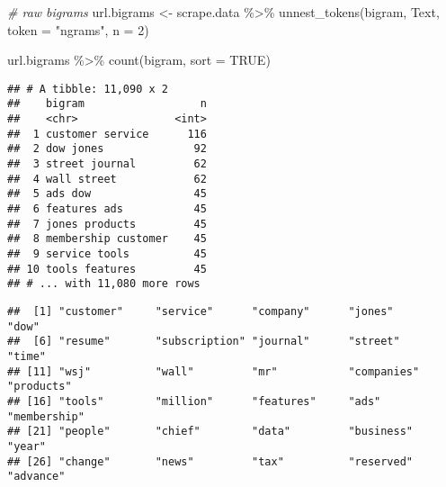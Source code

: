 \documentclass[
]{article}
\newenvironment{Shaded}{\begin{snugshade}}{\end{snugshade}}
\newcommand{\AttributeTok}[1]{\textcolor[rgb]{0.77,0.63,0.00}{#1}}
\newcommand{\CommentTok}[1]{\textcolor[rgb]{0.56,0.35,0.01}{\textit{#1}}}
\newcommand{\ConstantTok}[1]{\textcolor[rgb]{0.00,0.00,0.00}{#1}}
\newcommand{\DecValTok}[1]{\textcolor[rgb]{0.00,0.00,0.81}{#1}}
\newcommand{\FunctionTok}[1]{\textcolor[rgb]{0.00,0.00,0.00}{#1}}
\newcommand{\NormalTok}[1]{#1}
\newcommand{\OtherTok}[1]{\textcolor[rgb]{0.56,0.35,0.01}{#1}}
\newcommand{\SpecialCharTok}[1]{\textcolor[rgb]{0.00,0.00,0.00}{#1}}
\newcommand{\StringTok}[1]{\textcolor[rgb]{0.31,0.60,0.02}{#1}}
\begin{document}
\begin{Shaded}
\begin{Highlighting}[]
\CommentTok{\# raw bigrams}
\NormalTok{url.bigrams }\OtherTok{\textless{}{-}}\NormalTok{ scrape.data }\SpecialCharTok{\%\textgreater{}\%}
  \FunctionTok{unnest\_tokens}\NormalTok{(bigram, Text, }\AttributeTok{token =} \StringTok{"ngrams"}\NormalTok{, }\AttributeTok{n =} \DecValTok{2}\NormalTok{)}

\NormalTok{url.bigrams }\SpecialCharTok{\%\textgreater{}\%}
  \FunctionTok{count}\NormalTok{(bigram, }\AttributeTok{sort =} \ConstantTok{TRUE}\NormalTok{)}
\end{Highlighting}
\end{Shaded}

\begin{verbatim}
## # A tibble: 11,090 x 2
##    bigram                  n
##    <chr>               <int>
##  1 customer service      116
##  2 dow jones              92
##  3 street journal         62
##  4 wall street            62
##  5 ads dow                45
##  6 features ads           45
##  7 jones products         45
##  8 membership customer    45
##  9 service tools          45
## 10 tools features         45
## # ... with 11,080 more rows
\end{verbatim}

\begin{Shaded}
\end{Shaded}

\begin{verbatim}
##  [1] "customer"     "service"      "company"      "jones"        "dow"         
##  [6] "resume"       "subscription" "journal"      "street"       "time"        
## [11] "wsj"          "wall"         "mr"           "companies"    "products"    
## [16] "tools"        "million"      "features"     "ads"          "membership"  
## [21] "people"       "chief"        "data"         "business"     "year"        
## [26] "change"       "news"         "tax"          "reserved"     "advance"
\end{verbatim}
\end{document}

